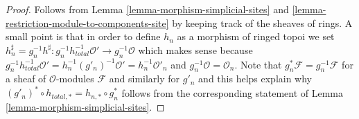 \documentclass{stacks-project}
\theoremstyle{plain}
\theoremstyle{definition}
\theoremstyle{remark}
\numberwithin{equation}{subsection}
\begin{document}
\begin{proof}
Follows from
Lemma \ref{lemma-morphism-simplicial-sites} and
\ref{lemma-restriction-module-to-components-site}
by keeping track of the sheaves of rings.
A small point is that in order to define $h_n$ as a morphism
of ringed topoi we set
$h_n^\sharp = g_n^{-1}h^\sharp :
g_n^{-1}h_{total}^{-1}\mathcal{O}' \to g_n^{-1}\mathcal{O}$
which makes sense because
$g_n^{-1}h_{total}^{-1}\mathcal{O}' = h_n^{-1}(g'_n)^{-1}\mathcal{O}' =
h_n^{-1}\mathcal{O}'_n$ and $g_n^{-1}\mathcal{O} = \mathcal{O}_n$.
Note that $g_n^*\mathcal{F} = g_n^{-1}\mathcal{F}$
for a sheaf of $\mathcal{O}$-modules $\mathcal{F}$
and similarly for $g'_n$ and this helps explain why
$(g'_n)^* \circ h_{total, *} = h_{n, *} \circ g_n^*$
follows from the corresponding statement of
Lemma \ref{lemma-morphism-simplicial-sites}.
\end{proof}
\end{document}
